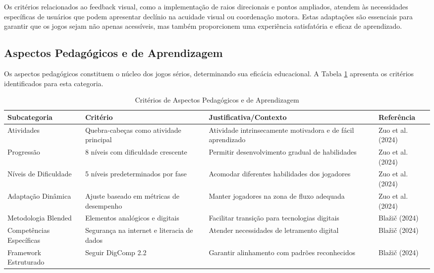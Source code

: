 Os critérios relacionados ao feedback visual, como a implementação de raios direcionais e pontos ampliados, atendem às necessidades específicas de usuários que podem apresentar declínio na acuidade visual ou coordenação motora. Estas adaptações são essenciais para garantir que os jogos sejam não apenas acessíveis, mas também proporcionem uma experiência satisfatória e eficaz de aprendizado.

\subsection{Aspectos Pedagógicos e de Aprendizagem}
\label{subsec:pedagogicos}

Os aspectos pedagógicos constituem o núcleo dos jogos sérios, determinando sua eficácia educacional. A Tabela \ref{tab:pedagogicos} apresenta os critérios identificados para esta categoria.

\begin{table}[H]
\centering
\caption{Critérios de Aspectos Pedagógicos e de Aprendizagem}
\label{tab:pedagogicos}
\begin{tabular}{p{2.5cm}p{3cm}p{5cm}p{3cm}}
\hline
\textbf{Subcategoria} & \textbf{Critério} & \textbf{Justificativa/Contexto} & \textbf{Referência} \\ \hline
Atividades & Quebra-cabeças como atividade principal & Atividade intrinsecamente motivadora e de fácil aprendizado & Zuo et al. (2024) \\
Progressão & 8 níveis com dificuldade crescente & Permitir desenvolvimento gradual de habilidades & Zuo et al. (2024) \\
Níveis de Dificuldade & 5 níveis predeterminados por fase & Acomodar diferentes habilidades dos jogadores & Zuo et al. (2024) \\
Adaptação Dinâmica & Ajuste baseado em métricas de desempenho & Manter jogadores na zona de fluxo adequada & Zuo et al. (2024) \\
Metodologia Blended & Elementos analógicos e digitais & Facilitar transição para tecnologias digitais & Blažič (2024) \\
Competências Específicas & Segurança na internet e literacia de dados & Atender necessidades de letramento digital & Blažič (2024) \\
Framework Estruturado & Seguir DigComp 2.2 & Garantir alinhamento com padrões reconhecidos & Blažič (2024) \\
\hline
\end{tabular}
\end{table}

